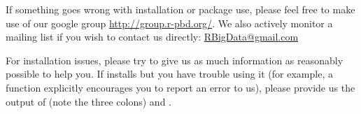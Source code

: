 If something goes wrong with installation or package use, please feel free to 
make use of our google group \url{http://group.r-pbd.org/}.  We also actively 
monitor a mailing list if you wish to contact us directly:
\href{mailto:RBigData@gmail.com}{RBigData@gmail.com}


For installation issues, please try to give us as much information as 
reasonably possible to help you.  If \thispackage installs but you have trouble 
using it (for example, a function explicitly encourages you to report an error 
to us), please provide us the output of  
(note the three colons) and .